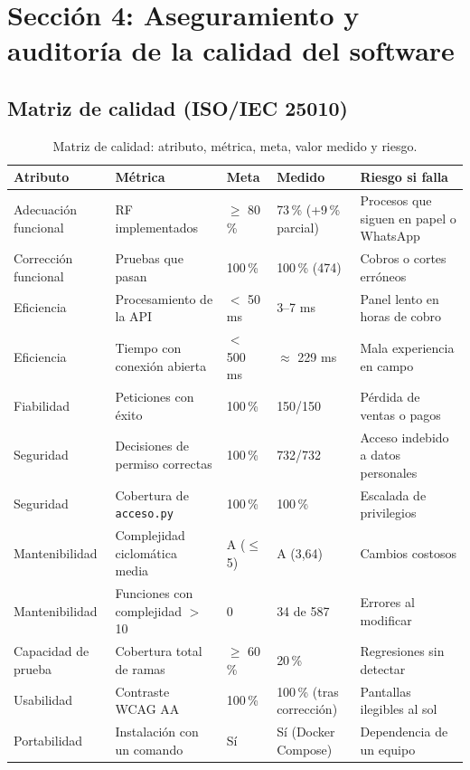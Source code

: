 \section{Sección 4: Aseguramiento y auditoría de la calidad del software}
\label{sec:ce02-e4-calidad}

\subsection{Matriz de calidad (ISO/IEC 25010)}

\begin{table}[H]
\centering
\caption{Matriz de calidad: atributo, métrica, meta, valor medido y riesgo.}
\label{tab:ce02-e4-matriz}
\small
\begin{tabularx}{\textwidth}{L{2.4cm}L{3.2cm}C{1.5cm}C{1.7cm}X}
\toprule
\textbf{Atributo} & \textbf{Métrica} & \textbf{Meta} & \textbf{Medido} & \textbf{Riesgo si falla} \\
\midrule
Adecuación funcional & RF implementados & $\ge$ 80\,\% & 73\,\% (+9\,\% parcial) & Procesos que siguen en papel o WhatsApp \\
Corrección funcional & Pruebas que pasan & 100\,\% & 100\,\% (474) & Cobros o cortes erróneos \\
Eficiencia & Procesamiento de la API & $<$ 50 ms & 3--7 ms & Panel lento en horas de cobro \\
Eficiencia & Tiempo con conexión abierta & $<$ 500 ms & $\approx$ 229 ms & Mala experiencia en campo \\
Fiabilidad & Peticiones con éxito & 100\,\% & 150/150 & Pérdida de ventas o pagos \\
Seguridad & Decisiones de permiso correctas & 100\,\% & 732/732 & Acceso indebido a datos personales \\
Seguridad & Cobertura de \texttt{acceso.py} & 100\,\% & 100\,\% & Escalada de privilegios \\
Mantenibilidad & Complejidad ciclomática media & A ($\le$ 5) & A (3,64) & Cambios costosos \\
Mantenibilidad & Funciones con complejidad $>$ 10 & 0 & 34 de 587 & Errores al modificar \\
Capacidad de prueba & Cobertura total de ramas & $\ge$ 60\,\% & 20\,\% & Regresiones sin detectar \\
Usabilidad & Contraste WCAG AA & 100\,\% & 100\,\% (tras corrección) & Pantallas ilegibles al sol \\
Portabilidad & Instalación con un comando & Sí & Sí (Docker Compose) & Dependencia de un equipo \\
\bottomrule
\end{tabularx}
\end{table}

